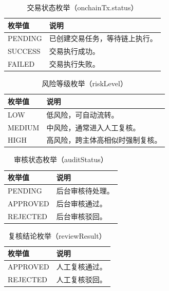 \documentclass[UTF8,a4paper,12pt]{ctexart}
\begin{document}
\begin{table}[H]
  \centering
  \caption{交易状态枚举（onchainTx.status）}
  \begin{tabularx}{0.96\textwidth}{p{} Y}
    \toprule
    枚举值 & 说明 \\
    \midrule
    PENDING & 已创建交易任务，等待链上执行。 \\
    SUCCESS & 交易执行成功。 \\
    FAILED & 交易执行失败。 \\
    \bottomrule
  \end{tabularx}
\end{table}

\begin{table}[H]
  \centering
  \caption{风险等级枚举（riskLevel）}
  \begin{tabularx}{0.96\textwidth}{p{} Y}
    \toprule
    枚举值 & 说明 \\
    \midrule
    LOW & 低风险，可自动流转。 \\
    MEDIUM & 中风险，通常进入人工复核。 \\
    HIGH & 高风险，跨主体高相似时强制复核。 \\
    \bottomrule
  \end{tabularx}
\end{table}

\begin{table}[H]
  \centering
  \caption{审核状态枚举（auditStatus）}
  \begin{tabularx}{0.96\textwidth}{p{} Y}
    \toprule
    枚举值 & 说明 \\
    \midrule
    PENDING & 后台审核待处理。 \\
    APPROVED & 后台审核通过。 \\
    REJECTED & 后台审核驳回。 \\
    \bottomrule
  \end{tabularx}
\end{table}

\begin{table}[H]
  \centering
  \caption{复核结论枚举（reviewResult）}
  \begin{tabularx}{0.96\textwidth}{p{} Y}
    \toprule
    枚举值 & 说明 \\
    \midrule
    APPROVED & 人工复核通过。 \\
    REJECTED & 人工复核驳回。 \\
    \bottomrule
  \end{tabularx}
\end{table}
\end{document}

